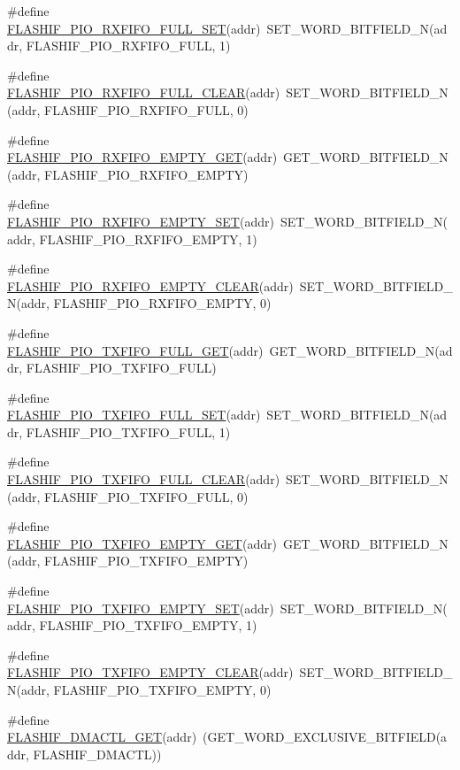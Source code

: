 \begin{DoxyCompactItemize}
\item 
\#define \hyperlink{a00551_a842ad42b2a962636e27a0dcd1b3a7085}{FLASHIF\_\-PIO\_\-RXFIFO\_\-FULL\_\-SET}(addr)~SET\_\-WORD\_\-BITFIELD\_\-N(addr, FLASHIF\_\-PIO\_\-RXFIFO\_\-FULL, 1)
\item 
\#define \hyperlink{a00551_a40778e72d32f3ad26f79e95d5bfb4e2b}{FLASHIF\_\-PIO\_\-RXFIFO\_\-FULL\_\-CLEAR}(addr)~SET\_\-WORD\_\-BITFIELD\_\-N(addr, FLASHIF\_\-PIO\_\-RXFIFO\_\-FULL, 0)
\item 
\#define \hyperlink{a00551_a442cb0cc2cbc9808ab60b1355825416d}{FLASHIF\_\-PIO\_\-RXFIFO\_\-EMPTY\_\-GET}(addr)~GET\_\-WORD\_\-BITFIELD\_\-N(addr, FLASHIF\_\-PIO\_\-RXFIFO\_\-EMPTY)
\item 
\#define \hyperlink{a00551_aeda4107b4efb42ca53028644bcf78a96}{FLASHIF\_\-PIO\_\-RXFIFO\_\-EMPTY\_\-SET}(addr)~SET\_\-WORD\_\-BITFIELD\_\-N(addr, FLASHIF\_\-PIO\_\-RXFIFO\_\-EMPTY, 1)
\item 
\#define \hyperlink{a00551_a75d0c3f512941ccfc410591e85484af5}{FLASHIF\_\-PIO\_\-RXFIFO\_\-EMPTY\_\-CLEAR}(addr)~SET\_\-WORD\_\-BITFIELD\_\-N(addr, FLASHIF\_\-PIO\_\-RXFIFO\_\-EMPTY, 0)
\item 
\#define \hyperlink{a00551_aed29a25516e9feb0f19ab40439d86646}{FLASHIF\_\-PIO\_\-TXFIFO\_\-FULL\_\-GET}(addr)~GET\_\-WORD\_\-BITFIELD\_\-N(addr, FLASHIF\_\-PIO\_\-TXFIFO\_\-FULL)
\item 
\#define \hyperlink{a00551_aa4e330846a0563c097ae860cb570bd82}{FLASHIF\_\-PIO\_\-TXFIFO\_\-FULL\_\-SET}(addr)~SET\_\-WORD\_\-BITFIELD\_\-N(addr, FLASHIF\_\-PIO\_\-TXFIFO\_\-FULL, 1)
\item 
\#define \hyperlink{a00551_aff9d0596abc044952f585ffe4755df0d}{FLASHIF\_\-PIO\_\-TXFIFO\_\-FULL\_\-CLEAR}(addr)~SET\_\-WORD\_\-BITFIELD\_\-N(addr, FLASHIF\_\-PIO\_\-TXFIFO\_\-FULL, 0)
\item 
\#define \hyperlink{a00551_a571de867a2280388dd46149285e5e87f}{FLASHIF\_\-PIO\_\-TXFIFO\_\-EMPTY\_\-GET}(addr)~GET\_\-WORD\_\-BITFIELD\_\-N(addr, FLASHIF\_\-PIO\_\-TXFIFO\_\-EMPTY)
\item 
\#define \hyperlink{a00551_a6e5235b358fb05a175bed65f9f94a2af}{FLASHIF\_\-PIO\_\-TXFIFO\_\-EMPTY\_\-SET}(addr)~SET\_\-WORD\_\-BITFIELD\_\-N(addr, FLASHIF\_\-PIO\_\-TXFIFO\_\-EMPTY, 1)
\item 
\#define \hyperlink{a00551_a25b16dc192db44d09b7d9ddc16367244}{FLASHIF\_\-PIO\_\-TXFIFO\_\-EMPTY\_\-CLEAR}(addr)~SET\_\-WORD\_\-BITFIELD\_\-N(addr, FLASHIF\_\-PIO\_\-TXFIFO\_\-EMPTY, 0)
\item 
\#define \hyperlink{a00551_a67f6de47ac21f8a1383b2483455fcf5f}{FLASHIF\_\-DMACTL\_\-GET}(addr)~(GET\_\-WORD\_\-EXCLUSIVE\_\-BITFIELD(addr, FLASHIF\_\-DMACTL))

\end{DoxyCompactItemize}
